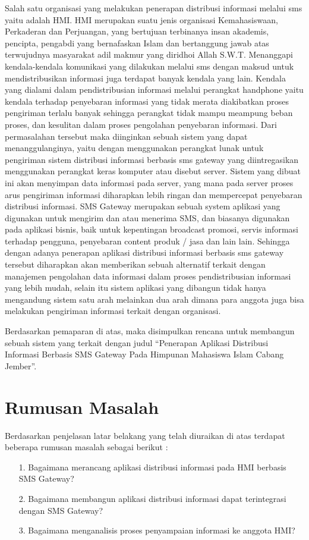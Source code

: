 \documentclass{jtetiproposalskripsi}
\begin{document}
Salah satu organisasi yang melakukan penerapan distribusi informasi melalui sms yaitu adalah HMI. HMI merupakan suatu jenis organisasi Kemahasiswaan, Perkaderan dan Perjuangan, yang bertujuan terbinanya insan akademis, pencipta, pengabdi yang bernafaskan Islam dan bertanggung jawab atas terwujudnya masyarakat adil makmur yang diridhoi Allah S.W.T. Menanggapi kendala-kendala komunikasi yang dilakukan melalui sms dengan maksud untuk mendistribusikan informasi juga terdapat banyak kendala yang lain. Kendala yang dialami dalam pendistribusian informasi melalui perangkat handphone  yaitu kendala terhadap penyebaran informasi yang tidak merata diakibatkan proses pengiriman terlalu banyak sehingga perangkat tidak mampu meampung beban proses, dan kesulitan  dalam proses pengolahan penyebaran informasi. Dari permasalahan tersebut maka diinginkan sebuah sistem yang dapat menanggulanginya, yaitu dengan menggunakan perangkat lunak untuk pengiriman sistem distribusi informasi berbasis sms gateway yang diintregasikan menggunakan perangkat keras komputer atau disebut server. Sistem yang dibuat ini akan menyimpan data informasi pada server, yang mana pada server proses arus pengiriman informasi diharapkan lebih ringan dan mempercepat penyebaran distribusi informasi. SMS Gateway merupakan sebuah system aplikasi yang digunakan untuk mengirim dan atau menerima SMS, dan biasanya digunakan pada aplikasi bisnis, baik untuk kepentingan broadcast promosi, servis informasi terhadap pengguna, penyebaran content produk / jasa dan lain lain. Sehingga dengan adanya penerapan aplikasi distribusi informasi berbasis sms gateway tersebut diharapkan akan memberikan sebuah alternatif terkait dengan manajemen pengolahan data informasi dalam proses pendistribusian informasi yang lebih mudah, selain itu sistem aplikasi yang dibangun tidak hanya mengandung sistem satu arah melainkan dua arah dimana para anggota juga bisa melakukan pengiriman informasi terkait dengan organisasi.

Berdasarkan pemaparan di atas, maka disimpulkan rencana untuk membangun sebuah sistem yang terkait dengan judul “Penerapan Aplikasi Distribusi Informasi Berbasis SMS Gateway Pada Himpunan Mahasiswa Islam Cabang Jember”.



\section{Rumusan Masalah}
Berdasarkan penjelasan latar belakang yang telah diuraikan di atas terdapat beberapa rumusan masalah sebagai berikut :
\begin{itemize}

\item[1.]	Bagaimana merancang aplikasi distribusi informasi pada HMI berbasis SMS Gateway?
\item[2.]	Bagaimana membangun aplikasi distribusi informasi dapat terintegrasi dengan SMS Gateway?
\item[3.]	Bagaimana menganalisis proses penyampaian informasi ke anggota HMI?
\end{itemize}
\end{document}
